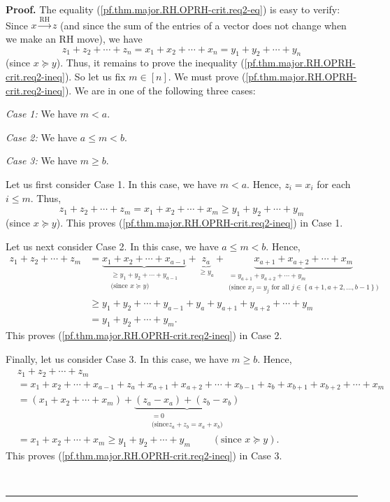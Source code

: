 \documentclass[numbers=enddot,12pt,final,onecolumn,notitlepage]{scrartcl}%
\numberwithin{exer}{subsection}
\theoremstyle{definition}
\newenvironment{proof}[1][Proof]{\noindent\textbf{#1.} }{\ \rule{0.5em}{0.5em}}
\begin{document}
\begin{proof}
The equality (\ref{pf.thm.major.RH.OPRH-crit.req2-eq}) is easy to verify:
Since $x\overset{\text{RH}}{\longrightarrow}z$ (and since the sum of the
entries of a vector does not change when we make an RH move), we have%
\[
z_{1}+z_{2}+\cdots+z_{n}=x_{1}+x_{2}+\cdots+x_{n}=y_{1}+y_{2}+\cdots+y_{n}%
\]
(since $x\succcurlyeq y$). Thus, it remains to prove the inequality
(\ref{pf.thm.major.RH.OPRH-crit.req2-ineq}). So let us fix $m\in\left[
n\right]  $. We must prove (\ref{pf.thm.major.RH.OPRH-crit.req2-ineq}). We are
in one of the following three cases:

\textit{Case 1:} We have $m<a$.

\textit{Case 2:} We have $a\leq m<b$.

\textit{Case 3:} We have $m\geq b$.

Let us first consider Case 1. In this case, we have $m<a$. Hence, $z_{i}%
=x_{i}$ for each $i\leq m$. Thus,%
\[
z_{1}+z_{2}+\cdots+z_{m}=x_{1}+x_{2}+\cdots+x_{m}\geq y_{1}+y_{2}+\cdots+y_{m}%
\]
(since $x\succcurlyeq y$). This proves
(\ref{pf.thm.major.RH.OPRH-crit.req2-ineq}) in Case 1.

Let us next consider Case 2. In this case, we have $a\leq m<b$. Hence,%
\begin{align*}
z_{1}+z_{2}+\cdots+z_{m}  &  =\underbrace{x_{1}+x_{2}+\cdots+x_{a-1}%
}_{\substack{\geq y_{1}+y_{2}+\cdots+y_{a-1}\\\text{(since }x\succcurlyeq
y\text{)}}}+\underbrace{z_{a}}_{\geq y_{a}}+\underbrace{x_{a+1}+x_{a+2}%
+\cdots+x_{m}}_{\substack{=y_{a+1}+y_{a+2}+\cdots+y_{m}\\\text{(since }%
x_{j}=y_{j}\text{ for all }j\in\left\{  a+1,a+2,\ldots,b-1\right\}  \text{)}%
}}\\
&  \geq y_{1}+y_{2}+\cdots+y_{a-1}+y_{a}+y_{a+1}+y_{a+2}+\cdots+y_{m}\\
&  =y_{1}+y_{2}+\cdots+y_{m}.
\end{align*}
This proves (\ref{pf.thm.major.RH.OPRH-crit.req2-ineq}) in Case 2.

Finally, let us consider Case 3. In this case, we have $m\geq b$. Hence,%
\begin{align*}
&  z_{1}+z_{2}+\cdots+z_{m}\\
&  =x_{1}+x_{2}+\cdots+x_{a-1}+z_{a}+x_{a+1}+x_{a+2}+\cdots+x_{b-1}%
+z_{b}+x_{b+1}+x_{b+2}+\cdots+x_{m}\\
&  =\left(  x_{1}+x_{2}+\cdots+x_{m}\right)  +\underbrace{\left(  z_{a}%
-x_{a}\right)  +\left(  z_{b}-x_{b}\right)  }_{\substack{=0\\\text{(since
}z_{a}+z_{b}=x_{a}+x_{b}\text{)}}}\\
&  =x_{1}+x_{2}+\cdots+x_{m}\geq y_{1}+y_{2}+\cdots+y_{m}%
\ \ \ \ \ \ \ \ \ \ \left(  \text{since }x\succcurlyeq y\right)  .
\end{align*}
This proves (\ref{pf.thm.major.RH.OPRH-crit.req2-ineq}) in Case 3.


\end{proof}
\end{document}
